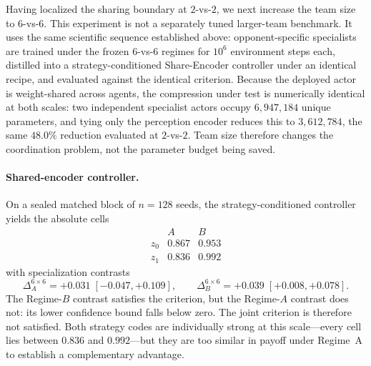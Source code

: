Having localized the sharing boundary at $2$-vs-$2$, we next increase the
team size to $6$-vs-$6$. This experiment is not a separately tuned larger-team
benchmark. It uses the same scientific sequence established above:
opponent-specific specialists are trained under the frozen $6$-vs-$6$ regimes
for $10^6$ environment steps each, distilled into a strategy-conditioned
Share-Encoder controller under an identical recipe, and evaluated against the
identical criterion. Because the deployed actor is weight-shared across agents,
the compression under test is numerically identical at both scales: two
independent specialist actors occupy $6{,}947{,}184$ unique parameters, and
tying only the perception encoder reduces this to $3{,}612{,}784$, the same
$48.0\%$ reduction evaluated at $2$-vs-$2$. Team size therefore changes the
coordination problem, not the parameter budget being saved.

\paragraph{Shared-encoder controller.}
On a sealed matched block of $n=128$ seeds, the strategy-conditioned
controller yields the absolute cells
\[
\begin{array}{c|cc}
 & A & B\\
\hline
z_0 & 0.867 & 0.953\\
z_1 & 0.836 & 0.992
\end{array}
\]
with specialization contrasts
\[
    \Delta_A^{6\times6}=+0.031\;[-0.047,+0.109],
    \qquad
    \Delta_B^{6\times6}=+0.039\;[+0.008,+0.078].
\]
The Regime-$B$ contrast satisfies the criterion, but the Regime-$A$ contrast
does not: its lower confidence bound falls below zero. The joint criterion is
therefore not satisfied. Both strategy codes are individually strong at this
scale---every cell lies between $0.836$ and $0.992$---but they are too similar
in payoff under Regime~A to establish a complementary advantage.

